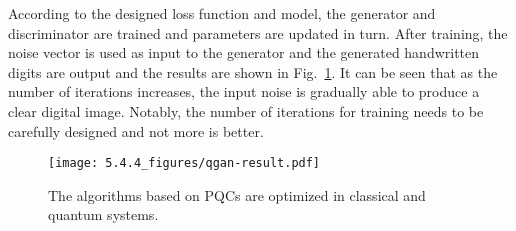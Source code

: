 According to the designed loss function and model, the generator and discriminator are trained and parameters are updated in turn. After training, the noise vector is used as input to the generator and the generated handwritten digits are output and the results are shown in Fig.~\ref{qgan-result}. It can be seen that as the number of iterations increases, the input noise is gradually able to produce a clear digital image. Notably, the number of iterations for training needs to be carefully designed and not more is better.
\begin{figure}[htbp]
  \centering
  \texttt{[image: 5.4.4\_figures/qgan-result.pdf]}
  \caption{\label{qgan-result} The algorithms based on PQCs are optimized in classical and quantum systems.}
\end{figure}